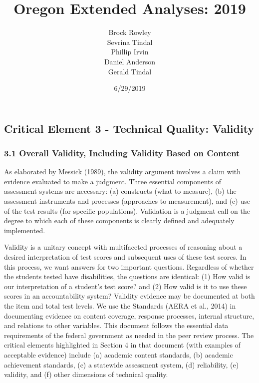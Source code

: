 \documentclass[]{article}
\title{Oregon Extended Analyses: 2019}
\author{Brock Rowley \\ Sevrina Tindal \\ Phillip Irvin \\ Daniel Anderson \\ Gerald Tindal}
\date{6/29/2019}
\begin{document}
\maketitle

{
\setcounter{tocdepth}{5}
\tableofcontents
}
\hypertarget{critical-element-3---technical-quality-validity}{%
\subsection{Critical Element 3 - Technical Quality:
Validity}\label{critical-element-3---technical-quality-validity}}

\hypertarget{overall-validity-including-validity-based-on-content}{%
\subsubsection{3.1 Overall Validity, Including Validity Based on
Content}\label{overall-validity-including-validity-based-on-content}}

As elaborated by Messick (1989), the validity argument involves a claim
with evidence evaluated to make a judgment. Three essential components
of assessment systems are necessary: (a) constructs (what to measure),
(b) the assessment instruments and processes (approaches to
measurement), and (c) use of the test results (for specific
populations). Validation is a judgment call on the degree to which each
of these components is clearly defined and adequately implemented.

Validity is a unitary concept with multifaceted processes of reasoning
about a desired interpretation of test scores and subsequent uses of
these test scores. In this process, we want answers for two important
questions. Regardless of whether the students tested have disabilities,
the questions are identical: (1) How valid is our interpretation of a
student's test score? and (2) How valid is it to use these scores in an
accountability system? Validity evidence may be documented at both the
item and total test levels. We use the Standards (AERA et al., 2014) in
documenting evidence on content coverage, response processes, internal
structure, and relations to other variables. This document follows the
essential data requirements of the federal government as needed in the
peer review process. The critical elements highlighted in Section 4 in
that document (with examples of acceptable evidence) include (a)
academic content standards, (b) academic achievement standards, (c) a
statewide assessment system, (d) reliability, (e) validity, and (f)
other dimensions of technical quality.
\end{document}
